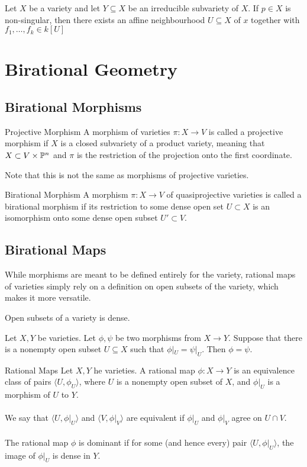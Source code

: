 \documentclass[a4paper]{article}
\begin{document}
\begin{prp}{}{} Let $X$ be a variety and let $Y\subseteq X$ be an irreducible subvariety of $X$. If $p\in X$ is non-singular, then there exists an affine neighbourhood $U\subseteq X$ of $x$ together with $f_1,\dots,f_k\in k[U]$
\end{prp}

\pagebreak
\section{Birational Geometry}
\subsection{Birational Morphisms}
\begin{defn}{Projective Morphism}{} A morphism of varieties $\pi:X\to V$ is called a projective morphism if $X$ is a closed subvariety of a product variety, meaning that $X\subset V\times\mathbb{P}^n$ and $\pi$ is the restriction of the projection onto the first coordinate. 
\end{defn}

Note that this is not the same as morphisms of projective varieties. 

\begin{defn}{Birational Morphism}{} A morphism $\pi:X\to V$ of quasiprojective varieties is called a birational morphism if its restriction to some dense open set $U\subset X$ is an isomorphism onto some dense open subset $U'\subset V$. 
\end{defn}

\subsection{Birational Maps}
While morphisms are meant to be defined entirely for the variety, rational maps of varieties simply rely on a definition on open subsets of the variety, which makes it more versatile. 

\begin{lmm}{}{} Open subsets of a variety is dense. 
\end{lmm}

\begin{lmm}{}{} Let $X,Y$ be varieties. Let $\phi,\psi$ be two morphisms from $X\to Y$. Suppose that there is a nonempty open subset $U\subseteq X$ such that $\phi|_U=\psi|_U$. Then $\phi=\psi$. 
\end{lmm}

\begin{defn}{Rational Maps}{} Let $X,Y$ he varieties. A rational map $\phi:X\to Y$ is an equivalence class of pairs $\langle U,\phi_U\rangle$, where $U$ is a nonempty open subset of $X$, and $\phi|_U$ is a morphism of $U$ to $Y$. \\~\\
We say that $\langle U,\phi|_U\rangle$ and $\langle V,\phi|_V\rangle$ are equivalent if $\phi|_U$ and $\phi|_V$ agree on $U\cap V$. \\~\\
The rational map $\phi$ is dominant if for some (and hence every) pair $\langle U,\phi|_U\rangle$, the image of $\phi|_U$ is dense in $Y$. 
\end{defn}
\end{document}
